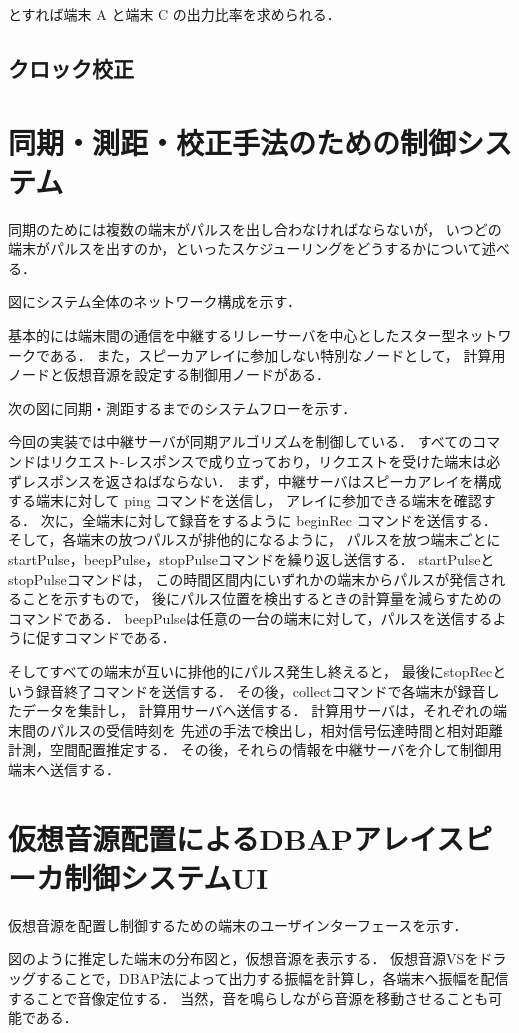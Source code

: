 とすれば端末 A と端末 C の出力比率を求められる．

\subsection{クロック校正}

\section{同期・測距・校正手法のための制御システム}
同期のためには複数の端末がパルスを出し合わなければならないが，
いつどの端末がパルスを出すのか，といったスケジューリングをどうするかについて述べる．

図にシステム全体のネットワーク構成を示す．


基本的には端末間の通信を中継するリレーサーバを中心としたスター型ネットワークである．
また，スピーカアレイに参加しない特別なノードとして，
計算用ノードと仮想音源を設定する制御用ノードがある．

次の図に同期・測距するまでのシステムフローを示す．


今回の実装では中継サーバが同期アルゴリズムを制御している．
すべてのコマンドはリクエスト-レスポンスで成り立っており，リクエストを受けた端末は必ずレスポンスを返さねばならない．
まず，中継サーバはスピーカアレイを構成する端末に対して ping コマンドを送信し，
アレイに参加できる端末を確認する．
次に，全端末に対して録音をするように beginRec コマンドを送信する．
そして，各端末の放つパルスが排他的になるように，
パルスを放つ端末ごとにstartPulse，beepPulse，stopPulseコマンドを繰り返し送信する．
startPulseとstopPulseコマンドは，
この時間区間内にいずれかの端末からパルスが発信されることを示すもので，
後にパルス位置を検出するときの計算量を減らすためのコマンドである．
beepPulseは任意の一台の端末に対して，パルスを送信するように促すコマンドである．


そしてすべての端末が互いに排他的にパルス発生し終えると，
最後にstopRecという録音終了コマンドを送信する．
その後，collectコマンドで各端末が録音したデータを集計し，
計算用サーバへ送信する．
計算用サーバは，それぞれの端末間のパルスの受信時刻を
先述の手法で検出し，相対信号伝達時間と相対距離計測，空間配置推定する．
その後，それらの情報を中継サーバを介して制御用端末へ送信する．

\section{仮想音源配置によるDBAPアレイスピーカ制御システムUI}

仮想音源を配置し制御するための端末のユーザインターフェースを示す．


図のように推定した端末の分布図と，仮想音源を表示する．
仮想音源VSをドラッグすることで，DBAP法によって出力する振幅を計算し，各端末へ振幅を配信することで音像定位する．
当然，音を鳴らしながら音源を移動させることも可能である．

